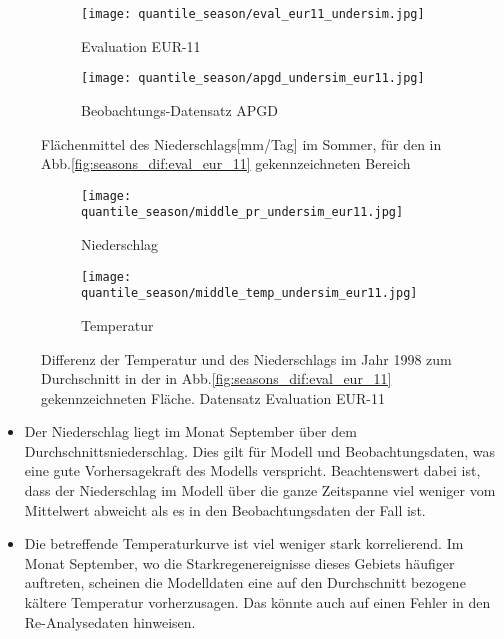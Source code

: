 \begin{figure}[h]
	\begin{subfigure}{0.49\textwidth}
		\texttt{[image: quantile\_season/eval\_eur11\_undersim.jpg]}
		\caption{Evaluation EUR-11}
		\label{fig:season:under_eval_eur11}
	\end{subfigure}
	\begin{subfigure}{0.49\textwidth}
		\texttt{[image: quantile\_season/apgd\_undersim\_eur11.jpg]}
		\caption{Beobachtungs-Datensatz APGD}
		\label{fig:season:under_apgd_eur11}
	\end{subfigure}
	\caption{Flächenmittel des Niederschlags[mm/Tag] im Sommer, für den in Abb.\ref{fig:seasons_dif:eval_eur_11} gekennzeichneten Bereich}
\end{figure}

\begin{figure}[h]
	\begin{subfigure}{0.49\textwidth}
		\texttt{[image: quantile\_season/middle\_pr\_undersim\_eur11.jpg]}
		\caption{Niederschlag}
	\end{subfigure}
	\begin{subfigure}{0.49\textwidth}
		\texttt{[image: quantile\_season/middle\_temp\_undersim\_eur11.jpg]}
		\caption{Temperatur}
	\end{subfigure}
	\caption{Differenz der Temperatur und des Niederschlags im Jahr 1998 zum Durchschnitt in der in Abb.\ref{fig:seasons_dif:eval_eur_11} gekennzeichneten Fläche. Datensatz Evaluation EUR-11}
	\label{fig:seasons:undersim_eval_eur11}
\end{figure}

\begin{itemize}
	\item Der Niederschlag liegt im Monat September über dem Durchschnittsniederschlag. Dies gilt für Modell und Beobachtungsdaten, was eine gute Vorhersagekraft des Modells verspricht. Beachtenswert dabei ist, dass der Niederschlag im Modell über die ganze Zeitspanne viel weniger vom Mittelwert abweicht als es in den Beobachtungsdaten der Fall ist.
	\item Die betreffende Temperaturkurve ist viel weniger stark korrelierend. Im Monat September, wo die Starkregenereignisse dieses Gebiets häufiger auftreten, scheinen die Modelldaten eine auf den Durchschnitt bezogene kältere Temperatur vorherzusagen. Das könnte auch auf einen Fehler in den Re-Analysedaten hinweisen.
\end{itemize}
\newpage

